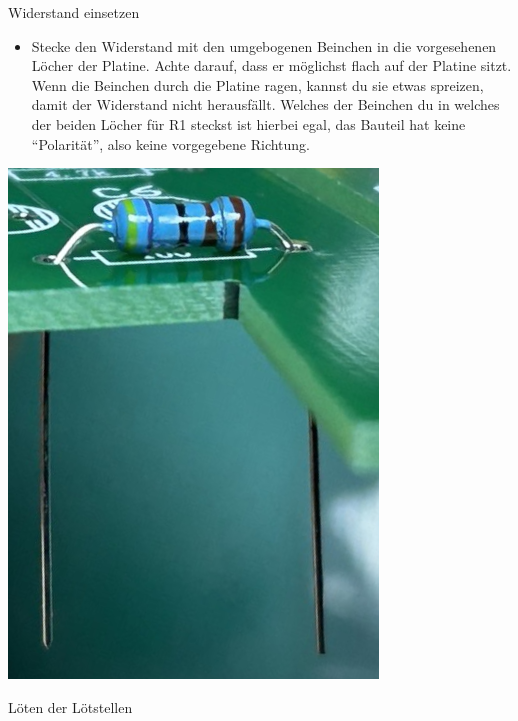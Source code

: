 \documentclass[10pt]{article}
\begin{document}
\begin{itemize}
\begin{minipage}{0.08\textwidth}
		\end{minipage}
		\begin{minipage}{0.9\textwidth}
			\item Widerstand einsetzen
			\begin{itemize}
				\item Stecke den Widerstand mit den umgebogenen Beinchen in die vorgesehenen Löcher der Platine. Achte darauf, dass er möglichst flach auf der Platine sitzt.
				Wenn die Beinchen durch die Platine ragen, kannst du sie etwas spreizen, damit der Widerstand nicht herausfällt. Welches der Beinchen du in welches der beiden Löcher für R1 steckst ist hierbei egal, das Bauteil hat keine \enquote{Polarität}, also keine vorgegebene Richtung.
			\end{itemize}
		\end{minipage}
		\begin{minipage}{0.08\textwidth}\raggedleft
			\includegraphics[width=\linewidth]{resistor-through.png}
		\end{minipage}
		\item Löten der Lötstellen
		

\end{itemize}
\end{document}
